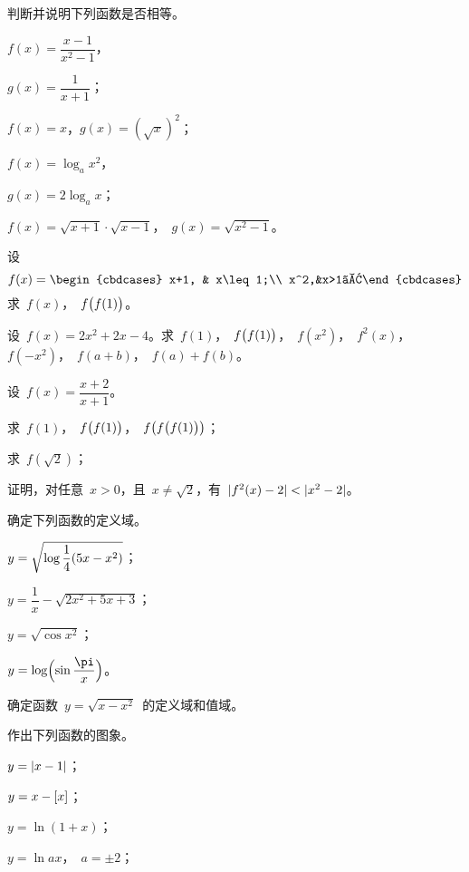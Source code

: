 \begin{exercise}
\item 判断并说明下列函数是否相等。
\begin{exlistcols}[4]
  \item $f(x)=\dfrac{x-1}{x^2-1}$，
  \item[]$g(x)=\dfrac1{x+1}$；
  \item $f(x)=x$，\quad $g(x)=(\sqrt x)^2$；
  \item $f(x)=\log_ax^2$，
  \item[]$g(x)=2\log_ax$；
  \item $f(x)=\sqrt{x+1}\cdot\sqrt{x-1}$，~$g(x)=\sqrt{x^2-1}$。
\end{exlistcols}
\item 设
\[
  f(x)=\begin{cbdcases}
  x+1, & x\leq 1;\\
  x^2,&x>1。\end{cbdcases}
\]
求~$f(x)$，~$f\Parenb{f(1)}$。
\item 设~$f(x)=2x^2+2x-4$。求~$f(1)$，~$f\Parenb{f(1)}$，~$f(x^2)$，~$f^2(x)$，~$f(-x^2)$，~$f(a+b)$，~$f(a)+f(b)$。
\item 设~$f(x)=\dfrac{x+2}{x+1}$。
\begin{exlistcols}
  \item 求~$f(1)$，~$f\Parenb{f(1)}$，~$f\Parenb{f\Parenb{f(1)}}$；
  \item 求~$f(\sqrt2)$；
  \item 证明，对任意~$x>0$，且~$x\neq\sqrt2$，有~$\abs{f^2(x)-2}<\abs{x^2-2}$。
\end{exlistcols}
\item 确定下列函数的定义域。
\begin{exlistcols}
  \item $y=\sqrt{\ln\dfrac1{\smash[b]{4}}(5x-x^2)}$；
  \item $y=\dfrac1x-\sqrt{2x^2+5x+3}$；
  \item $y=\sqrt{\cos x^2}$；
  \item $y=\ln\Paren[\Big]{\sin\dfrac\pi x}$。
\end{exlistcols}
\item 确定函数~$y=\sqrt{x-x^2}$~的定义域和值域。
\item 作出下列函数的图象。
\begin{exlistcols}[3]
  \item $y=\abs{x-1}$；
  \item $y=x-\Floor x$；
  \item $y=\ln(1+x)$；
  \item $y=\ln ax$，~$a=\pm2$；

\end{exlistcols}
\end{exercise}
